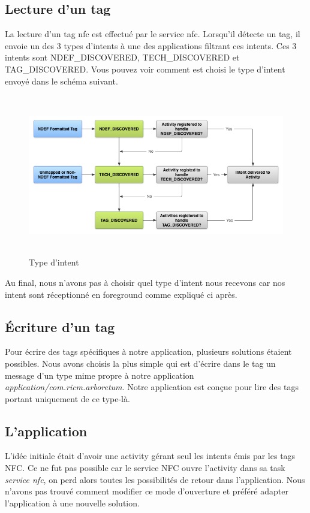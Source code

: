 \documentclass[a4paper,11pt]{article}
\begin{document}
      \subsection{Lecture d’un tag}
      La lecture d’un tag nfc est effectué par le service nfc. Lorsqu’il détecte un tag, il envoie un des 3 types d’intents à une des applications 
      filtrant ces intents. Ces 3 intents sont NDEF\_DISCOVERED, TECH\_DISCOVERED et TAG\_DISCOVERED. 
      Vous pouvez voir comment est choisi le type d’intent envoyé dans le schéma suivant.
    \begin{figure}[H]
     \begin{center}
      \includegraphics[width=15cm,height=7cm]{nfc_tag_dispatch.png}
      \caption{Type d'intent}
     \end{center}
    \end{figure}
      Au final, nous n’avons pas à choisir quel type d’intent nous recevons car nos intent sont réceptionné en foreground comme expliqué ci après.
      
      \subsection{Écriture d'un tag}
      Pour écrire des tags spécifiques à notre application, plusieurs solutions étaient possibles.
      Nous avons choisis la plus simple qui est d’écrire dans le tag un message d’un type mime propre à notre application \textit{application/com.ricm.arboretum}. 
      Notre application est conçue pour lire des tags portant uniquement de ce type-là.
      
      \subsection{L’application}
      L’idée initiale était d’avoir une activity gérant seul les intents émis par les tags NFC. 
      Ce ne fut pas possible car le service NFC ouvre l’activity dans sa task \textit{service nfc}, on perd alors toutes les possibilités de retour 
      dans l’application. 
      Nous n’avons pas trouvé comment modifier ce mode d’ouverture et préféré adapter l’application à une nouvelle solution.
      
\end{document}
